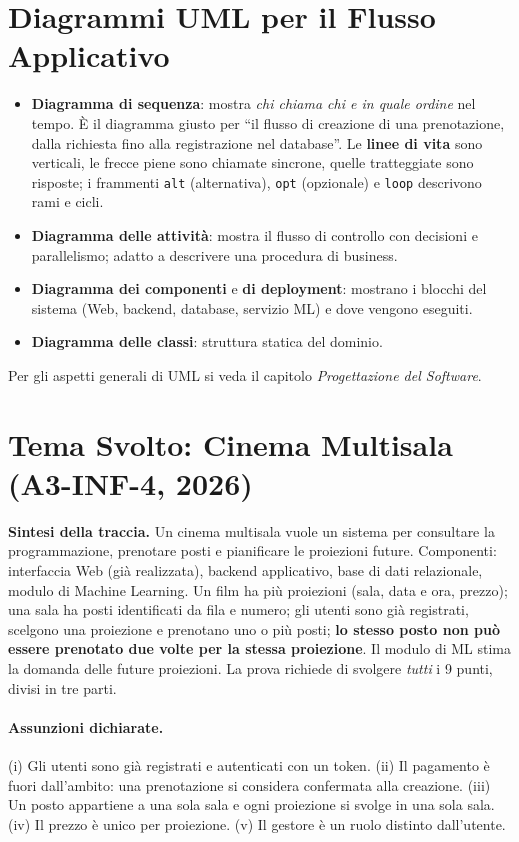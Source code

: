 \section{Diagrammi UML per il Flusso Applicativo}
\begin{itemize}
    \item \textbf{Diagramma di sequenza}: mostra \emph{chi chiama chi e in quale ordine} nel tempo. È il diagramma giusto per ``il flusso di creazione di una prenotazione, dalla richiesta fino alla registrazione nel database''. Le \textbf{linee di vita} sono verticali, le frecce piene sono chiamate sincrone, quelle tratteggiate sono risposte; i frammenti \texttt{alt} (alternativa), \texttt{opt} (opzionale) e \texttt{loop} descrivono rami e cicli.
    \item \textbf{Diagramma delle attività}: mostra il flusso di controllo con decisioni e parallelismo; adatto a descrivere una procedura di business.
    \item \textbf{Diagramma dei componenti} e \textbf{di deployment}: mostrano i blocchi del sistema (Web, backend, database, servizio ML) e dove vengono eseguiti.
    \item \textbf{Diagramma delle classi}: struttura statica del dominio.
\end{itemize}
Per gli aspetti generali di UML si veda il capitolo \emph{Progettazione del Software}.

\section{Tema Svolto: Cinema Multisala (A3-INF-4, 2026)}
\textbf{Sintesi della traccia.} Un cinema multisala vuole un sistema per consultare la programmazione, prenotare posti e pianificare le proiezioni future. Componenti: interfaccia Web (già realizzata), backend applicativo, base di dati relazionale, modulo di Machine Learning. Un film ha più proiezioni (sala, data e ora, prezzo); una sala ha posti identificati da fila e numero; gli utenti sono già registrati, scelgono una proiezione e prenotano uno o più posti; \textbf{lo stesso posto non può essere prenotato due volte per la stessa proiezione}. Il modulo di ML stima la domanda delle future proiezioni. La prova richiede di svolgere \emph{tutti} i 9 punti, divisi in tre parti.

\paragraph{Assunzioni dichiarate.}
(i) Gli utenti sono già registrati e autenticati con un token. (ii) Il pagamento è fuori dall'ambito: una prenotazione si considera confermata alla creazione. (iii) Un posto appartiene a una sola sala e ogni proiezione si svolge in una sola sala. (iv) Il prezzo è unico per proiezione. (v) Il gestore è un ruolo distinto dall'utente.

